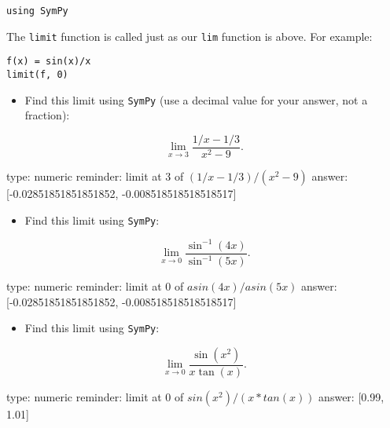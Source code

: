 \documentclass[12pt]{article}
\begin{document}
\begin{verbatim}
using SymPy
\end{verbatim}
The \texttt{limit} function is called just as our \texttt{lim} function
is above. For example:



\begin{verbatim}
f(x) = sin(x)/x
limit(f, 0)
\end{verbatim}
\begin{itemize}
\itemsep1pt\parskip0pt
\item
  Find this limit using \texttt{SymPy} (use a decimal value for your
  answer, not a fraction):
\end{itemize}

\[
\lim_{x \rightarrow 3} \frac{1/x - 1/3}{x^2 - 9}.
\]

\begin{answer}
    type: numeric
    reminder: limit at 3 of \( (1/x - 1/3) / (x^2 - 9) \)
    answer: [-0.02851851851851852, -0.008518518518518517]

\end{answer}

\begin{itemize}
\itemsep1pt\parskip0pt
\item
  Find this limit using \texttt{SymPy}:
\end{itemize}

\[
\lim_{x \rightarrow 0} \frac{\sin^{-1}(4x)}{\sin^{-1}(5x)}.
\]

\begin{answer}
    type: numeric
    reminder: limit at 0 of \( asin(4x)/asin(5x) \)
    answer: [-0.02851851851851852, -0.008518518518518517]

\end{answer}

\begin{itemize}
\itemsep1pt\parskip0pt
\item
  Find this limit using \texttt{SymPy}:
\end{itemize}

\[
\lim_{x \rightarrow 0} \frac{\sin(x^2)}{x\tan(x)}.
\]

\begin{answer}
    type: numeric
    reminder: limit at 0 of \( sin(x^2)/(x*tan(x)) \)
    answer: [0.99, 1.01]

\end{answer}
\end{document}
